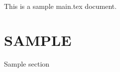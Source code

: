 \documentclass{article}
\begin{document}
This is a sample main.tex document.

\section{SAMPLE}
Sample section
\end{document}
